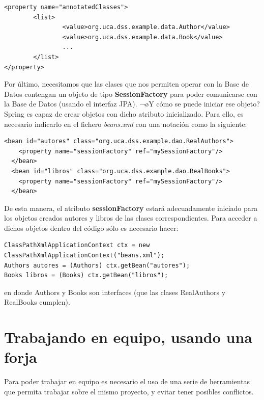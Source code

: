 \documentclass[11pt]{article}
\begin{document}
\begin{lstlisting}
<property name="annotatedClasses">
        <list>
                <value>org.uca.dss.example.data.Author</value>
                <value>org.uca.dss.example.data.Book</value>
                ...
        </list>
</property>     
\end{lstlisting}


Por último, necesitamos que las clases que nos permiten operar con la Base de Datos contengan un
objeto de tipo \textbf{SessionFactory} para poder comunicarse con la Base de Datos (usando el interfaz JPA). 
¬øY cómo se puede iniciar ese objeto? Spring es capaz de crear objetos con dicho atributo inicializado. 
Para ello, es necesario indicarlo en el fichero \emph{beans.xml} con una notación como la siguiente:


\begin{lstlisting}
<bean id="autores" class="org.uca.dss.example.dao.RealAuthors">
    <property name="sessionFactory" ref="mySessionFactory"/>
  </bean>
  <bean id="libros" class="org.uca.dss.example.dao.RealBooks">
    <property name="sessionFactory" ref="mySessionFactory"/>
  </bean>
\end{lstlisting}


De esta manera, el atributo \textbf{sessionFactory} estará adecuadamente iniciado para los objetos
creados autores y libros de las clases correspondientes. Para acceder a dichos objetos dentro
del código sólo es necesario hacer:


\lstset{language=java}
\begin{lstlisting}
ClassPathXmlApplicationContext ctx = new ClassPathXmlApplicationContext("beans.xml");           
Authors autores = (Authors) ctx.getBean("autores");
Books libros = (Books) ctx.getBean("libros");
\end{lstlisting}


en donde Authors y Books son interfaces (que las clases RealAuthors y RealBooks cumplen).
\section{Trabajando en equipo, usando una forja}
\label{sec-7}




Para poder trabajar en equipo es necesario el uso de una serie de herramientas que permita trabajar sobre el 
mismo proyecto, y evitar tener posibles conflictos. 
\end{document}
